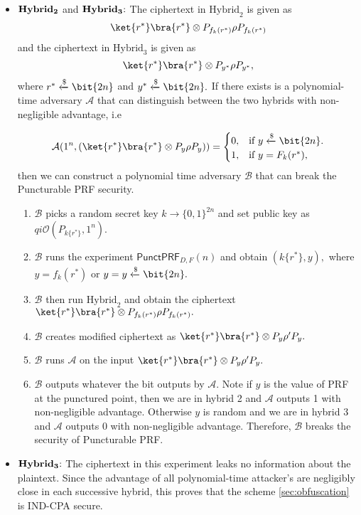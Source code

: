 \begin{itemize}
\item ${\bf Hybrid_2}$ and ${\bf Hybrid_3}\hspace{-0.09cm}:$ The ciphertext in $\mbox{Hybrid}_2$ is given as $$\ket{r^*}\bra{r^*} \otimes P_{f_k(r^*)} \rho P_{f_k(r^*)}$$ and the ciphertext in $\mbox{Hybrid}_3$ is given as $$\ket{r^*}\bra{r^*} \otimes P_{y^*} \rho P_{y^*},$$ where $r^*\xleftarrow[]{\$} \bit{2n}$ and $y^*\xleftarrow[]{\$} \bit{2n}.$ If there exists is a polynomial-time adversary $\mathcal{A}$ that can distinguish between the two hybrids with non-negligible advantage, i.e

\[
    \mathcal{A}(1^n, (\ket{r^*}\bra{r^*} \otimes P_{y} \rho P_{y} ))=
\begin{cases}
    0, & \text{if } y\xleftarrow[]{\$} \bit{2n}.\\
    1, & \text{if }  y=F_k(r^*),
\end{cases}
\]
then we can construct a polynomial time adversary $\mathcal{B}$ that can break the Puncturable PRF security.

\begin{enumerate}
\item $\mathcal{B}$ picks a random secret key $k\rightarrow \{0,1\}^{2n}$ and set public key as  $qi\mathcal{O}(P_{k\{r^*\}},1^n).$
\item $\mathcal{B}$ runs the experiment $\textsf{PunctPRF}_{D,F}(n)$ and obtain $(k\{r^*\}, y),$ where $y=f_k(r^*)$ or $y=y\xleftarrow[]{\$} \bit{2n}.$
\item $\mathcal{B}$ then  run  $\mbox{Hybrid}_2$  and obtain the ciphertext $\ket{r^*}\bra{r^*} \otimes P_{f_k(r^*)} \rho P_{f_k(r^*)}.$
\item $\mathcal{B}$ creates modified ciphertext  as $\ket{r^*}\bra{r^*} \otimes P_{y} \rho^\prime P_{y}.$
\item  $\mathcal{B}$ runs $\mathcal{A}$ on the input  $\ket{r^*}\bra{r^*} \otimes P_{y} \rho^\prime P_y.$
\item $\mathcal{B}$ outputs whatever the bit outputs by $\mathcal{A}.$  Note if $y$ is the value of PRF at the punctured point, then we are in hybrid 2 and $\mathcal{A}$ outputs 1 with non-negligible advantage. Otherwise $y$ is random and we are in hybrid 3 and $\mathcal{A}$ outputs 0 with non-negligible advantage. Therefore, $\mathcal{B}$ breaks the security of Puncturable PRF.
\end{enumerate}
\end{itemize}

\begin{itemize}
\item ${\bf Hybrid_3}\hspace{-0.09cm}:$ The ciphertext in this experiment leaks no information about the plaintext. Since the advantage of all polynomial-time attacker's are negligibly close in each successive hybrid, this proves that the  scheme \ref{sec:obfuscation} is IND-CPA secure.
\end{itemize}

